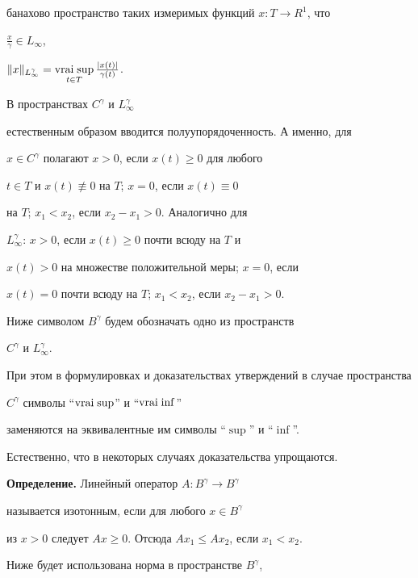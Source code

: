 банахово пространство таких измеримых функций $x: T\to R^1$, что


$\frac{x}{\gamma}\in L_\infty$,


$\|x\|_{L_{\infty}^{\gamma}} = \vraisup\limits_{t\in T}


\frac{|x(t)|}{\gamma(t)}$.





В пространствах $C^\gamma$ и $L_\infty^\gamma$


естественным образом вводится полуупорядоченность. А именно, для


$x\in C^\gamma$ полагают $x>0$, если $x(t)\geq 0$ для любого


$t\in T$ и $x(t)\not\equiv 0$ на $T$; $x=0$, если $x(t)\equiv 0$


на $T$; $x_1 <x_2$, если $x_2-x_1>0$. Аналогично для


$L_\infty^\gamma$: $x>0$, если $x(t)\geq 0$ почти всюду на $T$ и


$x(t) >0$ на множестве положительной меры; $x=0$, если


$x(t) = 0$ почти всюду на $T$; $x_1<x_2$, если $x_2-x_1>0$.





Ниже символом $B^\gamma$ будем обозначать одно из пространств


$C^\gamma$ и $L_\infty^\gamma$.


При этом в формулировках и доказательствах утверждений в случае пространства


$C^\gamma$ символы ``$\vraisup$'' и ``$\vraiinf$''


заменяются на эквивалентные им символы ``$\sup$'' и ``$\inf$''.


Естественно, что в некоторых случаях доказательства упрощаются.


\medskip





{\bf Определение.} Линейный оператор $A:B^\gamma\to B^\gamma$


называется изотонным, если для любого $x\in B^{\gamma}$


из $x>0$ следует $Ax\geq 0$. Отсюда $Ax_1\leq Ax_2$, если $x_1<x_2$.


\medskip





Ниже будет использована норма в пространстве $B^\gamma$,


